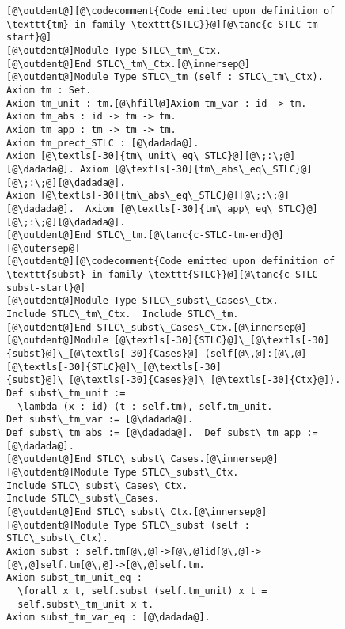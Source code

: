 \begin{figure}
\vspace{-5pt}
\begin{minipage}{\textwidth}
\begin{multicols}{2}



\newcommand{\innersep}{\vspace{6pt}}
\newcommand{\outersep}{\vspace{5pt}}
\newcommand{\outdent}{\!\!\!}

\begin{lstlisting}
[@\outdent@][@\codecomment{Code emitted upon definition of \texttt{tm} in family \texttt{STLC}}@][@\tanc{c-STLC-tm-start}@]
[@\outdent@]Module Type STLC\_tm\_Ctx.
[@\outdent@]End STLC\_tm\_Ctx.[@\innersep@]
[@\outdent@]Module Type STLC\_tm (self : STLC\_tm\_Ctx).
Axiom tm : Set.
Axiom tm_unit : tm.[@\hfill@]Axiom tm_var : id -> tm.
Axiom tm_abs : id -> tm -> tm.
Axiom tm_app : tm -> tm -> tm.
Axiom tm_prect_STLC : [@\dadada@].
Axiom [@\textls[-30]{tm\_unit\_eq\_STLC}@][@\;:\;@][@\dadada@]. Axiom [@\textls[-30]{tm\_abs\_eq\_STLC}@][@\;:\;@][@\dadada@].
Axiom [@\textls[-30]{tm\_abs\_eq\_STLC}@][@\;:\;@][@\dadada@].  Axiom [@\textls[-30]{tm\_app\_eq\_STLC}@][@\;:\;@][@\dadada@].
[@\outdent@]End STLC\_tm.[@\tanc{c-STLC-tm-end}@][@\outersep@]
[@\outdent@][@\codecomment{Code emitted upon definition of \texttt{subst} in family \texttt{STLC}}@][@\tanc{c-STLC-subst-start}@]
[@\outdent@]Module Type STLC\_subst\_Cases\_Ctx.
Include STLC\_tm\_Ctx.  Include STLC\_tm.
[@\outdent@]End STLC\_subst\_Cases\_Ctx.[@\innersep@]
[@\outdent@]Module [@\textls[-30]{STLC}@]\_[@\textls[-30]{subst}@]\_[@\textls[-30]{Cases}@] (self[@\,@]:[@\,@][@\textls[-30]{STLC}@]\_[@\textls[-30]{subst}@]\_[@\textls[-30]{Cases}@]\_[@\textls[-30]{Ctx}@]).
Def subst\_tm_unit :=
  \lambda (x : id) (t : self.tm), self.tm_unit.
Def subst\_tm_var := [@\dadada@].
Def subst\_tm_abs := [@\dadada@].  Def subst\_tm_app := [@\dadada@].
[@\outdent@]End STLC\_subst\_Cases.[@\innersep@]
[@\outdent@]Module Type STLC\_subst\_Ctx.
Include STLC\_subst\_Cases\_Ctx.
Include STLC\_subst\_Cases.
[@\outdent@]End STLC\_subst\_Ctx.[@\innersep@]
[@\outdent@]Module Type STLC\_subst (self : STLC\_subst\_Ctx).
Axiom subst : self.tm[@\,@]->[@\,@]id[@\,@]->[@\,@]self.tm[@\,@]->[@\,@]self.tm.
Axiom subst_tm_unit_eq :
  \forall x t, self.subst (self.tm_unit) x t =
  self.subst\_tm_unit x t.
Axiom subst_tm_var_eq : [@\dadada@].

\end{lstlisting}
\end{multicols}
\end{minipage}
\end{figure}
